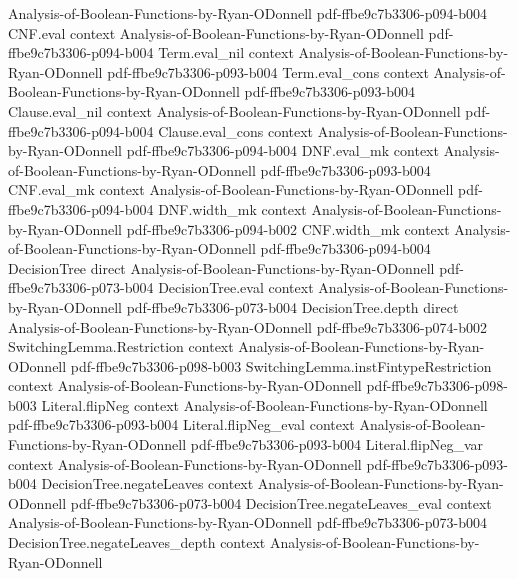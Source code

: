 \begin{lemma}
  {Analysis-of-Boolean-Functions-by-Ryan-ODonnell}
  {pdf-ffbe9c7b3306-p094-b004}
\proofstep
  {CNF.eval}
  {context}
  {Analysis-of-Boolean-Functions-by-Ryan-ODonnell}
  {pdf-ffbe9c7b3306-p094-b004}
\proofstep
  {Term.eval_nil}
  {context}
  {Analysis-of-Boolean-Functions-by-Ryan-ODonnell}
  {pdf-ffbe9c7b3306-p093-b004}
\proofstep
  {Term.eval_cons}
  {context}
  {Analysis-of-Boolean-Functions-by-Ryan-ODonnell}
  {pdf-ffbe9c7b3306-p093-b004}
\proofstep
  {Clause.eval_nil}
  {context}
  {Analysis-of-Boolean-Functions-by-Ryan-ODonnell}
  {pdf-ffbe9c7b3306-p094-b004}
\proofstep
  {Clause.eval_cons}
  {context}
  {Analysis-of-Boolean-Functions-by-Ryan-ODonnell}
  {pdf-ffbe9c7b3306-p094-b004}
\proofstep
  {DNF.eval_mk}
  {context}
  {Analysis-of-Boolean-Functions-by-Ryan-ODonnell}
  {pdf-ffbe9c7b3306-p093-b004}
\proofstep
  {CNF.eval_mk}
  {context}
  {Analysis-of-Boolean-Functions-by-Ryan-ODonnell}
  {pdf-ffbe9c7b3306-p094-b004}
\proofstep
  {DNF.width_mk}
  {context}
  {Analysis-of-Boolean-Functions-by-Ryan-ODonnell}
  {pdf-ffbe9c7b3306-p094-b002}
\proofstep
  {CNF.width_mk}
  {context}
  {Analysis-of-Boolean-Functions-by-Ryan-ODonnell}
  {pdf-ffbe9c7b3306-p094-b004}
\proofstep
  {DecisionTree}
  {direct}
  {Analysis-of-Boolean-Functions-by-Ryan-ODonnell}
  {pdf-ffbe9c7b3306-p073-b004}
\proofstep
  {DecisionTree.eval}
  {context}
  {Analysis-of-Boolean-Functions-by-Ryan-ODonnell}
  {pdf-ffbe9c7b3306-p073-b004}
\proofstep
  {DecisionTree.depth}
  {direct}
  {Analysis-of-Boolean-Functions-by-Ryan-ODonnell}
  {pdf-ffbe9c7b3306-p074-b002}
\proofstep
  {SwitchingLemma.Restriction}
  {context}
  {Analysis-of-Boolean-Functions-by-Ryan-ODonnell}
  {pdf-ffbe9c7b3306-p098-b003}
\proofstep
  {SwitchingLemma.instFintypeRestriction}
  {context}
  {Analysis-of-Boolean-Functions-by-Ryan-ODonnell}
  {pdf-ffbe9c7b3306-p098-b003}
\proofstep
  {Literal.flipNeg}
  {context}
  {Analysis-of-Boolean-Functions-by-Ryan-ODonnell}
  {pdf-ffbe9c7b3306-p093-b004}
\proofstep
  {Literal.flipNeg_eval}
  {context}
  {Analysis-of-Boolean-Functions-by-Ryan-ODonnell}
  {pdf-ffbe9c7b3306-p093-b004}
\proofstep
  {Literal.flipNeg_var}
  {context}
  {Analysis-of-Boolean-Functions-by-Ryan-ODonnell}
  {pdf-ffbe9c7b3306-p093-b004}
\proofstep
  {DecisionTree.negateLeaves}
  {context}
  {Analysis-of-Boolean-Functions-by-Ryan-ODonnell}
  {pdf-ffbe9c7b3306-p073-b004}
\proofstep
  {DecisionTree.negateLeaves_eval}
  {context}
  {Analysis-of-Boolean-Functions-by-Ryan-ODonnell}
  {pdf-ffbe9c7b3306-p073-b004}
\proofstep
  {DecisionTree.negateLeaves_depth}
  {context}
  {Analysis-of-Boolean-Functions-by-Ryan-ODonnell}

\end{lemma}

